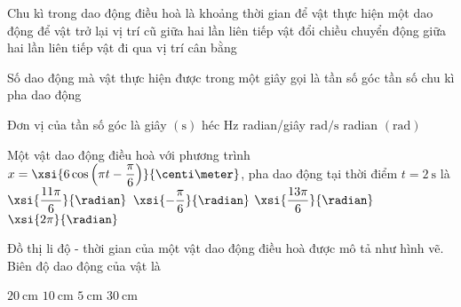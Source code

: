 \begin{ex}
	Chu kì trong dao động điều hoà là khoảng thời gian
	\choice
	{\True để vật thực hiện một dao động}
	{để vật trở lại vị trí cũ}
	{giữa hai lần liên tiếp vật đổi chiều chuyển động}
	{giữa hai lần liên tiếp vật đi qua vị trí cân bằng}
	\loigiai{}
\end{ex}
\begin{ex}
Số dao động mà vật thực hiện được trong một giây gọi là	
	\choice
	{tần số góc}
	{\True tần số}
	{chu kì}
	{pha dao động}
	\loigiai{}
\end{ex}
\begin{ex}
	Đơn vị của tần số góc là
	\choice
	{giây $\left(\si{\second}\right)$}
	{héc $\si{\hertz}$}
	{\True radian/giây $\si{\radian/\second}$}
	{radian $\left(\si{\radian}\right)$}
	\loigiai{}
\end{ex}
\begin{ex}
	Một vật dao động điều hoà với phương trình $x=\xsi{6\cos\left(\pi t-\dfrac{\pi}{6}\right)}{\centi\meter}$, pha dao động tại thời điểm $t=\SI{2}{\second}$ là
	\choice
	{\True $\xsi{\dfrac{11\pi}{6}}{\radian}$}
	{$\xsi{-\dfrac{\pi}{6}}{\radian}$}
	{$\xsi{\dfrac{13\pi}{6}}{\radian}$}
{$\xsi{2\pi}{\radian}$}
	\loigiai{}
\end{ex}
\begin{ex}
	Đồ thị li độ - thời gian của một vật dao động điều hoà được mô tả như hình vẽ. Biên độ dao động của vật là
	\begin{center}
	\end{center}
	\choice
	{$\SI{20}{\centi\meter}$}
	{\True $\SI{10}{\centi\meter}$}
	{$\SI{5}{\centi\meter}$}
	{$\SI{30}{\centi\meter}$}
	\loigiai{}
\end{ex}
